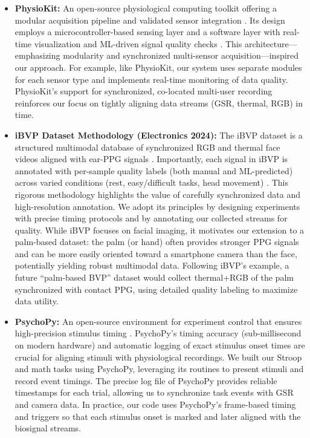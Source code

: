 \documentclass{report}
\begin{document}
\begin{itemize}
	\item \textbf{PhysioKit:} An open-source physiological computing toolkit offering a modular acquisition pipeline and validated sensor integration \cite{physiokit}. Its design employs a microcontroller-based sensing layer and a software layer with real-time visualization and ML-driven signal quality checks \cite{physiokit}. This architecture---emphasizing modularity and synchronized multi-sensor acquisition---inspired our approach. For example, like PhysioKit, our system uses separate modules for each sensor type and implements real-time monitoring of data quality. PhysioKit's support for synchronized, co-located multi-user recording \cite{physiokit} reinforces our focus on tightly aligning data streams (GSR, thermal, RGB) in time.

	\item \textbf{iBVP Dataset Methodology (Electronics 2024):} The iBVP dataset is a structured multimodal database of synchronized RGB and thermal face videos aligned with ear-PPG signals \cite{ibvp}. Importantly, each signal in iBVP is annotated with per-sample quality labels (both manual and ML-predicted) across varied conditions (rest, easy/difficult tasks, head movement) \cite{ibvp}. This rigorous methodology highlights the value of carefully synchronized data and high-resolution annotation. We adopt its principles by designing experiments with precise timing protocols and by annotating our collected streams for quality. While iBVP focuses on facial imaging, it motivates our extension to a palm-based dataset: the palm (or hand) often provides stronger PPG signals and can be more easily oriented toward a smartphone camera than the face, potentially yielding robust multimodal data. Following iBVP's example, a future ``palm-based BVP'' dataset would collect thermal+RGB of the palm synchronized with contact PPG, using detailed quality labeling to maximize data utility.

	\item \textbf{PsychoPy:} An open-source environment for experiment control that ensures high-precision stimulus timing \cite{psychopy}. PsychoPy's timing accuracy (sub-millisecond on modern hardware) and automatic logging of exact stimulus onset times \cite{psychopy} are crucial for aligning stimuli with physiological recordings. We built our Stroop and math tasks using PsychoPy, leveraging its routines to present stimuli and record event timings. The precise log file of PsychoPy provides reliable timestamps for each trial, allowing us to synchronize task events with GSR and camera data. In practice, our code uses PsychoPy's frame-based timing and triggers so that each stimulus onset is marked and later aligned with the biosignal streams.


\end{itemize}
\end{document}
